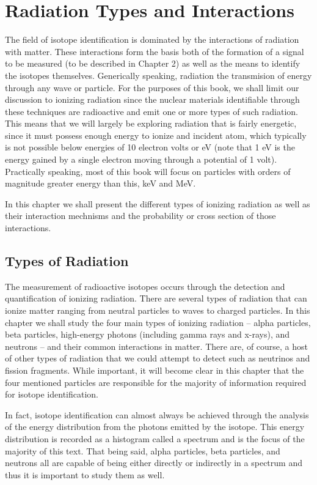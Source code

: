\chapter{Radiation Types and Interactions}

The field of isotope identification is dominated by the interactions of radiation with matter.  These interactions form the basis both of the formation of a signal to be measured (to be described in Chapter 2) as well as the means to identify the isotopes themselves.  Generically speaking, radiation the transmision of energy through any wave or particle.  For the purposes of this book, we shall limit our discussion to ionizing radiation since the nuclear materials identifiable through these techniques are radioactive and emit one or more types of such radiation.  This means that we will largely be exploring radiation that is fairly energetic, since it must possess enough energy to ionize and incident atom, which typically is not possible below energies of 10 electron volts or eV (note that 1 eV is the energy gained by a single electron moving through a potential of 1 volt).  Practically speaking, most of this book will focus on particles with orders of magnitude greater energy than this, keV and MeV.

In this chapter we shall present the different types of ionizing radiation as well  as their interaction mechnisms and the probability or cross section of those interactions.

\section{Types of Radiation}

The measurement of radioactive isotopes occurs through the detection and quantification of ionizing radiation.  There are several types of radiation that can ionize matter ranging from neutral particles to waves to charged particles.  
In this chapter we shall study the four main types of ionizing radiation --  alpha particles, beta particles, high-energy photons (including gamma rays and x-rays), and neutrons -- and their common interactions in matter.  There are, of course, a host of other types of radiation that we could attempt to detect such as neutrinos and fission fragments.  While important, it will become clear in this chapter that the four mentioned particles are responsible for the majority of information required for isotope identification.  

In fact, isotope identification can almost always be achieved through the analysis of the energy distribution from the photons emitted by the isotope.  This energy distribution is recorded as a histogram called a spectrum and is the focus of the majority of this text.  That being said, alpha particles, beta particles, and neutrons all are capable of being either directly or indirectly in a spectrum and thus it is important to study them as well.

